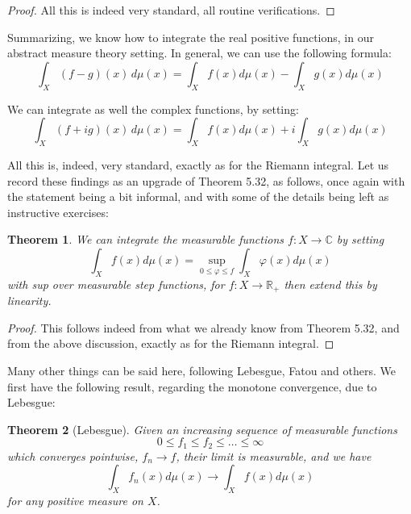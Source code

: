 \documentclass[12pt]{amsbook}
\newtheorem{theorem}{Theorem}[chapter]
\begin{document}
\begin{proof}
All this is indeed very standard, all routine verifications.
\end{proof}

Summarizing, we know how to integrate the real positive functions, in our abstract measure theory setting. In general, we can use the following formula:
$$\int_X(f-g)(x)\,d\mu(x)=\int_Xf(x)d\mu(x)-\int_Xg(x)d\mu(x)$$

We can integrate as well the complex functions, by setting:
$$\int_X(f+ig)(x)\,d\mu(x)=\int_Xf(x)d\mu(x)+i\int_Xg(x)d\mu(x)$$

All this is, indeed, very standard, exactly as for the Riemann integral. Let us record these findings as an upgrade of Theorem 5.32, as follows, once again with the statement being a bit informal, and with some of the details being left as instructive exercises:

\begin{theorem}
We can integrate the measurable functions $f:X\to\mathbb C$ by setting
$$\int_Xf(x)d\mu(x)=\sup_{0\leq\varphi\leq f}\int_X\varphi(x)d\mu(x)$$
with sup over measurable step functions, for $f:X\to\mathbb R_+$ then extend this by linearity.
\end{theorem}

\begin{proof}
This follows indeed from what we already know from Theorem 5.32, and from the above discussion, exactly as for the Riemann integral.
\end{proof}

Many other things can be said here, following Lebesgue, Fatou and others. We first have the following result, regarding the monotone convergence, due to Lebesgue:

\begin{theorem}[Lebesgue]
Given an increasing sequence of measurable functions 
$$0\leq f_1\leq f_2\leq\ldots\leq\infty$$
which converges pointwise, $f_n\to f$, their limit is measurable, and we have
$$\int_Xf_n(x)d\mu(x)\to\int_Xf(x)d\mu(x)$$
for any positive measure on $X$.
\end{theorem}
\end{document}
